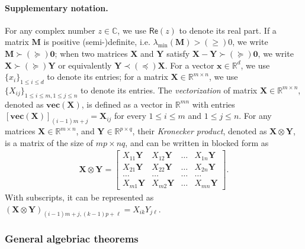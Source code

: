 \paragraph{Supplementary notation.} For any complex number $z \in \mathbb{C}$, we use $\mathsf{Re}(z)$ to denote its real part. If a matrix $\bm{M}$ is positive (semi-)definite, i.e. $\lambda_{\min}(\bm{M}) > (\geq) 0$, we write $\bm{M} \succ (\succeq) \bm{0}$; when two matrices $\bm{X}$ and $\bm{Y}$ satisfy $\bm{X} - \bm{Y} \succ (\succeq) \bm{0}$, we write $\bm{X} \succ(\succeq) \bm{Y}$ or equivalently $\bm{Y} \prec (\preceq) \bm{X}$. 
For a vector $\bm{x} \in \mathbb{R}^d$, we use $\{x_i\}_{1 \leq i \leq d}$ to denote its entries; for a matrix $\bm{X} \in \mathbb{R}^{m \times n}$, we use $\{X_{ij}\}_{1 \leq i \leq m,1\leq j \leq n}$ to denote its entries. The \emph{vectorization} of matrix $\bm{X} \in \mathbb{R}^{m \times n}$, denoted as $\textbf{vec}(\bm{X})$, is defined as a vector in $\mathbb{R}^{mn}$ with entries $[\textbf{vec}(\bm{X})]_{(i-1)m+j} = \bm{X}_{ij}$ for every $1 \leq i \leq m$ and $1 \leq j \leq n$. 
For any matrices $\bm{X} \in \mathbb{R}^{m \times n}$, and $\bm{Y} \in \mathbb{R}^{p \times q}$, their \emph{Kronecker product}, denoted as $\bm{X} \otimes \bm{Y}$, is a matrix of the size of $mp \times nq$, and can be written in blocked form as
\begin{align*}
\bm{X} \otimes \bm{Y} = \begin{bmatrix}
X_{11}\bm{Y} & X_{12}\bm{Y} & \ldots & X _{1n}\bm{Y} \\ 
X_{21}\bm{Y} & X_{22}\bm{Y} & \ldots & X_{2n} \bm{Y} \\ 
\ldots & \ldots & \ldots & \ldots \\ 
X_{m1}\bm{Y} & X_{m2}\bm{Y} &\ldots &X_{mn} \bm{Y}
\end{bmatrix}.
\end{align*}
With subscripts, it can be represented as $(\bm{X} \otimes \bm{Y})_{(i-1)m + j, (k-1)p + \ell} = X_{ik}Y_{j\ell}$.

\subsubsection{General algebriac theorems}

